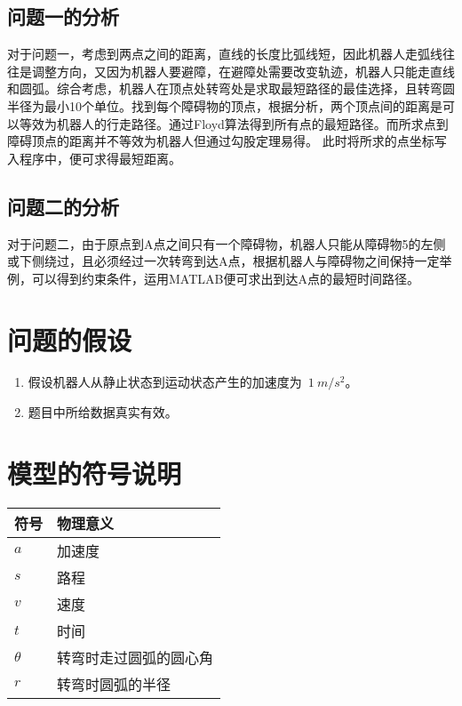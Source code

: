 \documentclass{JXUSTmodeling}
\begin{document}
\subsection{问题一的分析}\label{sub:2.2}
对于问题一，考虑到两点之间的距离，直线的长度比弧线短，因此机器人走弧线往往是调整方向，又因为机器人要避障，在避障处需要改变轨迹，机器人只能走直线和圆弧。综合考虑，机器人在顶点处转弯处是求取最短路径的最佳选择，且转弯圆半径为最小10个单位。找到每个障碍物的顶点，根据分析，两个顶点间的距离是可以等效为机器人的行走路径。通过Floyd算法得到所有点的最短路径。而所求点到障碍顶点的距离并不等效为机器人但通过勾股定理易得。 此时将所求的点坐标写入程序中，便可求得最短距离。
\subsection{问题二的分析}\label{sub:2.3}
对于问题二，由于原点到A点之间只有一个障碍物，机器人只能从障碍物5的左侧或下侧绕过，且必须经过一次转弯到达A点，根据机器人与障碍物之间保持一定举例，可以得到约束条件，运用MATLAB便可求出到达A点的最短时间路径。
\newpage
\section{问题的假设}\label{sub:3}
\begin{enumerate}
  \item 假设机器人从静止状态到运动状态产生的加速度为~$1 \ m/s^2$。
  \item 题目中所给数据真实有效。
\end{enumerate}
\section{模型的符号说明}\label{sub:4}

\begin{table}[htbp]
  \centering
    \begin{tabularx}{\textwidth}{YY}
    \toprule
    符号 & 物理意义\\
    \midrule
    $a$ & 加速度\\
    $s$ & 路程\\
    $v$ & 速度\\
    $t$ & 时间\\
    $\theta$ & 转弯时走过圆弧的圆心角\\
    $r$ & 转弯时圆弧的半径\\
    \bottomrule
  \end{tabularx}
\end{table}
\end{document}

